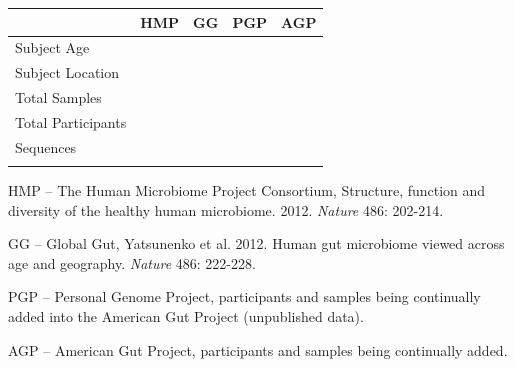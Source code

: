 \documentclass[10pt,letterpaper]{article}
\newenvironment{my_itemize}{
\begin{itemize}
  \setlength{\itemsep}{1pt}
  \setlength{\parskip}{0pt}
  \setlength{\parsep}{0pt}}{\end{itemize}
}
\begin{document}
\begin{framed}
\parbox{0.30\textwidth}{
}
\hspace{5mm}
\parbox{0.60\textwidth}{
{\footnotesize
\begin{tabular}{ l c c c c }													
\hline \addlinespace[1mm]													
 & HMP & GG	& PGP & AGP \\		
\hline \addlinespace[1mm]													
Subject Age & \hmpAge{} & \ggAge{} & \pgpAge{} & \agpAge{} \\
Subject Location & \hmpLocation{} & \ggLocation{} & \pgpLocation{} & \agpLocation{} \\
Total Samples & \hmpSamples{} & \ggSamples{} & \pgpSamples{} & \agpSamples{} \\
Total Participants & \hmpParticipants{} & \ggParticipants{} & \pgpParticipants{} & \agpParticipants{} \\
Sequences & \hmpSequences{} & \ggSequences{} & \pgpSequences{} & \agpSequences{} \\ \addlinespace[.5mm]
\hline															
\end{tabular}															
}
}
\vspace{-8mm}
{\fontsize{7pt}{7pt}\selectfont
\begin{my_itemize}
\item[] HMP -- The Human Microbiome Project Consortium, Structure, function and diversity of the healthy human microbiome. 2012. {\em Nature} 486: 202-214.
\item[] GG -- Global Gut, Yatsunenko et al. 2012. Human gut microbiome viewed across age and geography. {\em Nature} 486: 222-228.
\item[] PGP -- Personal Genome Project, participants and samples being continually added into the American Gut Project (unpublished data).
\item[] AGP -- American Gut Project, participants and samples being continually added.
\end{my_itemize}
\vspace{-3mm}
}
\label{tab1} 
\end{framed}
\end{document}
